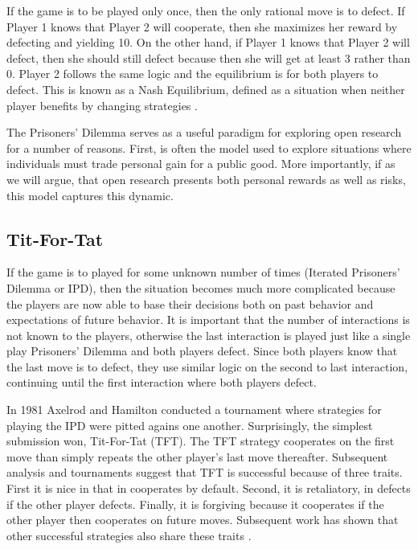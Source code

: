 \documentclass[11pt]{article} %
\begin{document}
If the game is to be played only once, then the only rational move is to defect. If Player 1 knows that Player 2 will cooperate, then she maximizes her reward by defecting and yielding 10. On the other hand, if Player 1 knows that Player 2 will defect, then she should still defect because then she will get at least 3 rather than 0. Player 2 follows the same logic and the equilibrium is for both players to defect. This is known as a Nash Equilibrium, defined as a situation when neither player benefits by changing strategies \cite{unm.b196052419570101}.

The Prisoners' Dilemma serves as a useful paradigm for exploring open research for a number of reasons. First, is often the model used to explore situations where individuals must trade personal gain for a public good. More importantly, if as we will argue, that open research presents both personal rewards as well as risks, this model captures this dynamic.

\subsection{Tit-For-Tat}
If the game is to played for some unknown number of times (Iterated Prisoners' Dilemma or IPD), then the situation becomes much more complicated because the players are now able to base their decisions both on past behavior and expectations of future behavior. It is important that the number of interactions is not known to the players, otherwise the last interaction is played just like a single play Prisoners' Dilemma and both players defect. Since both players know that the last move is to defect, they use similar logic on the second to last interaction, continuing until the first interaction where both players defect.

 In 1981  Axelrod and Hamilton \cite{axelrodhamilton1981} conducted a tournament where strategies for playing the IPD were pitted agains one another. Surprisingly, the simplest submission won, Tit-For-Tat (TFT). The TFT strategy cooperates on the first move than simply repeats the other player's last move thereafter. Subsequent analysis and tournaments suggest that TFT is successful because of three traits. First it is nice in that in cooperates by default. Second, it is retaliatory, in defects if the other player defects. Finally, it is forgiving because it cooperates if the other player then cooperates on future moves. Subsequent work has shown that other successful strategies also share these traits
\cite{axelroddion1988, ABAGFBEC19920101, unm.b685148920000101}.
\end{document}
